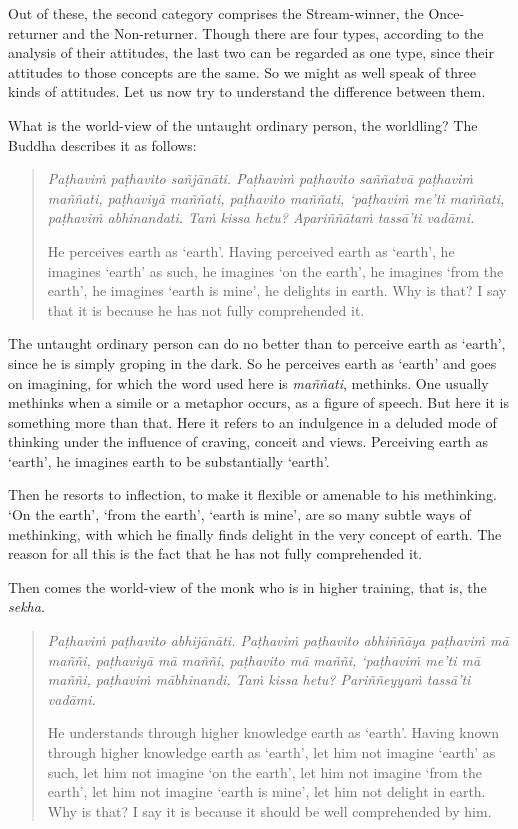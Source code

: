 Out of these, the second category comprises the Stream-winner, the Once-returner and the Non-returner. Though there are four types, according to the analysis of their attitudes, the last two can be regarded as one type, since their attitudes to those concepts are the same. So we might as well speak of three kinds of attitudes. Let us now try to understand the difference between them.

What is the world-view of the untaught ordinary person, the worldling? The Buddha describes it as follows:

\begin{quote}
\emph{Paṭhaviṁ paṭhavito sañjānāti. Paṭhaviṁ paṭhavito saññatvā paṭhaviṁ maññati, paṭhaviyā maññati, paṭhavito maññati, `paṭhaviṁ me'ti maññati, paṭhaviṁ abhinandati. Taṁ kissa hetu? Apariññātaṁ tassā'ti vadāmi.}

He perceives earth as `earth'. Having perceived earth as `earth', he imagines `earth' as such, he imagines `on the earth', he imagines `from the earth', he imagines `earth is mine', he delights in earth. Why is that? I say that it is because he has not fully comprehended it.
\end{quote}

The untaught ordinary person can do no better than to perceive earth as `earth', since he is simply groping in the dark. So he perceives earth as `earth' and goes on imagining, for which the word used here is \emph{maññati}, methinks. One usually methinks when a simile or a metaphor occurs, as a figure of speech. But here it is something more than that. Here it refers to an indulgence in a deluded mode of thinking under the influence of craving, conceit and views. Perceiving earth as `earth', he imagines earth to be substantially `earth'.

Then he resorts to inflection, to make it flexible or amenable to his methinking. `On the earth', `from the earth', `earth is mine', are so many subtle ways of methinking, with which he finally finds delight in the very concept of earth. The reason for all this is the fact that he has not fully comprehended it.

Then comes the world-view of the monk who is in higher training, that is, the \emph{sekha}.

\begin{quote}
\emph{Paṭhaviṁ paṭhavito abhijānāti. Paṭhaviṁ paṭhavito abhiññāya paṭhaviṁ mā maññi, paṭhaviyā mā maññi, paṭhavito mā maññi, `paṭhaviṁ me'ti mā maññi, paṭhaviṁ mābhinandi. Taṁ kissa hetu? Pariññeyyaṁ tassā'ti vadāmi.}

He understands through higher knowledge earth as `earth'. Having known through higher knowledge earth as `earth', let him not imagine `earth' as such, let him not imagine `on the earth', let him not imagine `from the earth', let him not imagine `earth is mine', let him not delight in earth. Why is that? I say it is because it should be well comprehended by him.
\end{quote}


